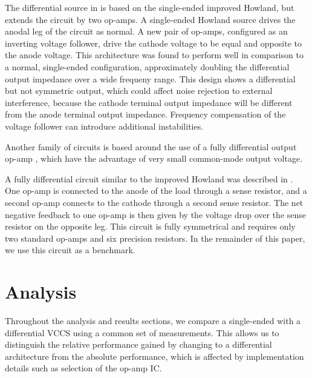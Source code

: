 \documentclass[10pt]{article}
\begin{document}
The differential source in \cite{pmid24880419} is based on the single-ended improved Howland, but extends the circuit by two op-amps. A single-ended Howland source drives the anodal leg of the circuit as normal. A new pair of op-amps, configured as an inverting voltage follower, drive the cathode voltage to be equal and opposite to the anode voltage. This architecture was found to perform well in comparison to a normal, single-ended configuration, approximately doubling the differential output impedance over a wide frequeny range. This design shows a differential but not symmetric output, which could affect noise rejection to external interference, because the cathode terminal output impedance will be different from the anode terminal output impedance. Frequency compensation of the voltage follower can introduce additional instabilities.

Another family of circuits is based around the use of a fully differential output op-amp \cite{offsetfree_bidirectional_current_source}\cite{SirtoliMorcellesVincence}, which have the advantage of very small common-mode output voltage.

A fully differential circuit similar to the improved Howland was described in \cite{simmonds2009differential}. One op-amp is connected to the anode of the load through a sense resistor, and a second op-amp connects to the cathode through a second sense resistor. The net negative feedback to one op-amp is then given by the voltage drop over the sense resistor on the opposite leg. This circuit is fully symmetrical and requires only two standard op-amps and six precision resistors. In the remainder of this paper, we use this circuit as a benchmark.


\section{Analysis}
\label{sec:analysis}

Throughout the analysis and results sections, we compare a single-ended with a differential VCCS using a common set of measurements. This allows us to distinguish the relative performance gained by changing to a differential architecture from the absolute performance, which is affected by implementation details such as selection of the op-amp IC.
\end{document}
